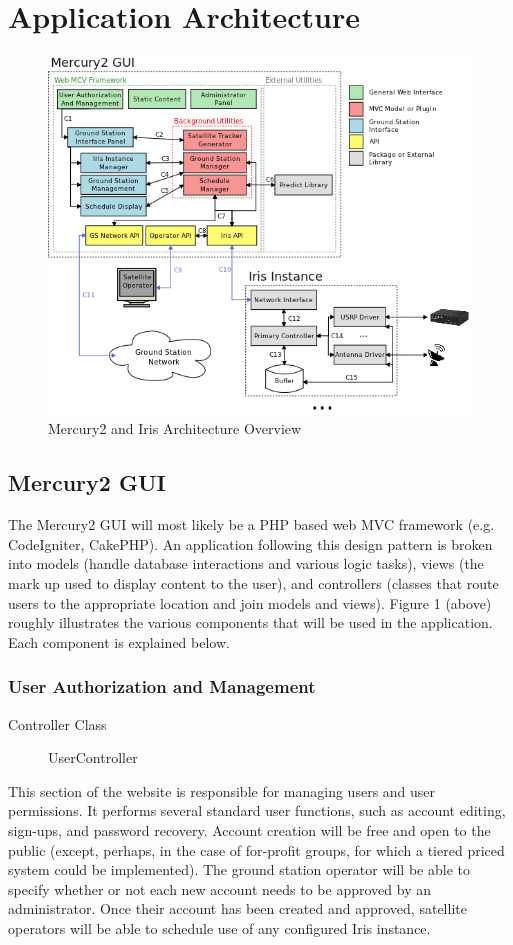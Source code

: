 \documentclass{mxl-note}
\begin{document}
\section{Application Architecture}
\begin{figure}[hbtp]
\centering
\includegraphics[scale=.60]{Architecture_Overview.png}
\caption{Mercury2 and Iris Architecture Overview}
\end{figure}

\subsection{Mercury2 GUI}
The Mercury2 GUI will most likely be a PHP based web MVC framework (e.g. CodeIgniter, CakePHP). An application following this design pattern is broken into models (handle database interactions and various logic tasks), views (the mark up used to display content to the user), and controllers (classes that route users to the appropriate location and join models and views). Figure 1 (above) roughly illustrates the various components that will be used in the application. Each component is explained below. 

\subsubsection{User Authorization and Management}
\begin{description}
	\item [Controller Class]UserController
\end{description}
This section of the website is responsible for managing users and user permissions. It performs several standard user functions, such as account editing, sign-ups, and password recovery. Account creation will be free and open to the public (except, perhaps, in the case of for-profit groups, for which a tiered priced system could be implemented). The ground station operator will be able to specify whether or not each new account needs to be approved by an administrator. Once their account has been created and approved, satellite operators will be able to schedule use of any configured Iris instance.
\end{document}
